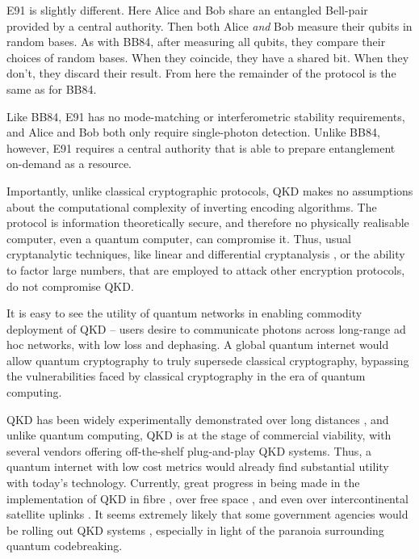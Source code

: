 E91 is slightly different. Here Alice and Bob share an entangled Bell-pair provided by a central authority. Then both Alice \textit{and} Bob measure their qubits in random bases. As with BB84, after measuring all qubits, they compare their choices of random bases. When they coincide, they have a shared bit. When they don't, they discard their result. From here the remainder of the protocol is the same as for BB84.




Like BB84, E91 has no mode-matching or interferometric stability requirements, and Alice and Bob both only require single-photon detection. Unlike BB84, however, E91 requires a central authority that is able to prepare entanglement on-demand as a resource.

Importantly, unlike classical cryptographic protocols, QKD makes no assumptions about the computational complexity of inverting encoding algorithms. The protocol is information theoretically secure, and therefore no physically realisable computer, even a quantum computer, can compromise it. Thus, usual cryptanalytic techniques, like linear and differential cryptanalysis \cite{bib:Schneier96}, or the ability to factor large numbers, that are employed to attack other encryption protocols, do not compromise QKD.

It is easy to see the utility of quantum networks in enabling commodity deployment of QKD -- users desire to communicate photons across long-range ad hoc networks, with low loss and dephasing. A global quantum internet would allow quantum cryptography to truly supersede classical cryptography, bypassing the vulnerabilities faced by classical cryptography in the era of quantum computing.

QKD has been widely experimentally demonstrated over long distances \cite{bib:Muller96}, and unlike quantum computing, QKD is at the stage of commercial viability, with several vendors offering off-the-shelf plug-and-play QKD systems. Thus, a quantum internet with low cost metrics would already find substantial utility with today's technology. Currently, great progress in being made in the implementation of QKD in fibre \cite{???}, over free space \cite{bib:Buttler00}, and even over intercontinental satellite uplinks \cite{JWP}. It seems extremely likely that some government agencies would be rolling out QKD systems \cite{bib:Secret}, especially in light of the paranoia surrounding quantum codebreaking.

